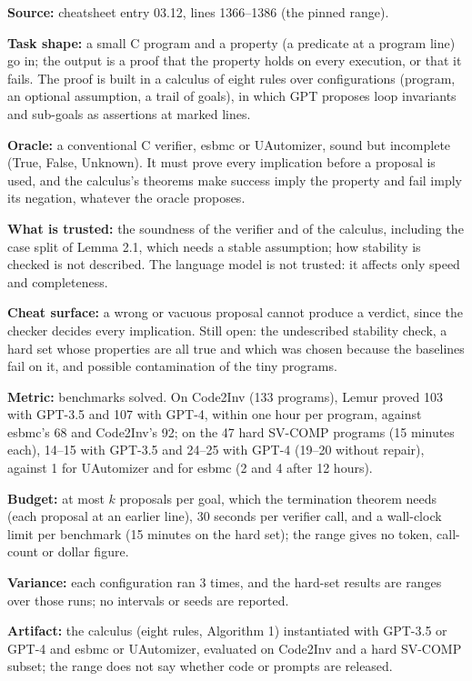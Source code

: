 \documentclass[11pt]{article}
\begin{document}
\begin{answer}
\textbf{Source:} cheatsheet entry 03.12, lines 1366--1386 (the pinned range).

\textbf{Task shape:} a small C program and a property (a predicate at a
program line) go in; the output is a proof that the property holds on every
execution, or that it fails. The proof is built in a calculus of eight rules
over configurations (program, an optional assumption, a trail of goals),
in which GPT proposes loop invariants and sub-goals as assertions at marked
lines.

\textbf{Oracle:} a conventional C verifier, esbmc or UAutomizer, sound but
incomplete (True, False, Unknown). It must prove every implication before a
proposal is used, and the calculus's theorems make success imply the property
and fail imply its negation, whatever the oracle proposes.

\textbf{What is trusted:} the soundness of the verifier and of the calculus,
including the case split of Lemma 2.1, which needs a stable assumption; how
stability is checked is not described. The language model is not trusted: it
affects only speed and completeness.

\textbf{Cheat surface:} a wrong or vacuous proposal cannot produce a verdict,
since the checker decides every implication. Still open: the undescribed
stability check, a hard set whose properties are all true and which was
chosen because the baselines fail on it, and possible contamination of the
tiny programs.

\textbf{Metric:} benchmarks solved. On Code2Inv (133 programs), Lemur proved
103 with GPT-3.5 and 107 with GPT-4, within one hour per program, against
esbmc's 68 and Code2Inv's 92; on the 47 hard SV-COMP programs (15 minutes
each), 14--15 with GPT-3.5 and 24--25 with GPT-4 (19--20 without repair),
against 1 for UAutomizer and for esbmc (2 and 4 after 12 hours).

\textbf{Budget:} at most $k$ proposals per goal, which the termination
theorem needs (each proposal at an earlier line), 30 seconds per verifier
call, and a wall-clock limit per benchmark (15 minutes on the hard set); the
range gives no token, call-count or dollar figure.

\textbf{Variance:} each configuration ran 3 times, and the hard-set results
are ranges over those runs; no intervals or seeds are reported.

\textbf{Artifact:} the calculus (eight rules, Algorithm 1) instantiated with
GPT-3.5 or GPT-4 and esbmc or UAutomizer, evaluated on Code2Inv and a hard
SV-COMP subset; the range does not say whether code or prompts are released.
\end{answer}
\end{document}
